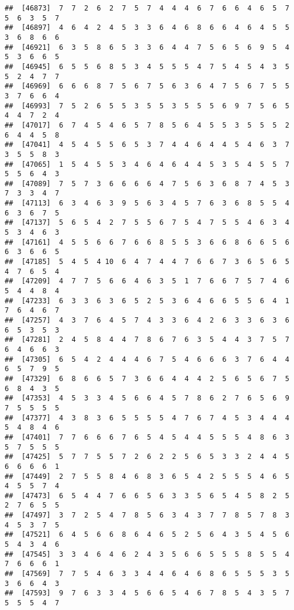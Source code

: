 \documentclass[
]{book}
\begin{document}
\begin{verbatim}
##  [46873]  7  7  2  6  2  7  5  7  4  4  4  6  7  6  6  4  6  5  7  5  6  3  5  7
##  [46897]  4  6  4  2  4  5  3  3  6  4  6  8  6  6  4  6  4  5  5  3  6  8  6  6
##  [46921]  6  3  5  8  6  5  3  3  6  4  4  7  5  6  5  6  9  5  4  5  3  6  6  5
##  [46945]  6  5  5  6  8  5  3  4  5  5  5  4  7  5  4  5  4  3  5  5  2  4  7  7
##  [46969]  6  6  6  8  7  5  6  7  5  6  3  6  4  7  5  6  7  5  5  3  7  6  6  4
##  [46993]  7  5  2  6  5  5  3  5  5  3  5  5  5  6  9  7  5  6  5  4  4  7  2  4
##  [47017]  6  7  4  5  4  6  5  7  8  5  6  4  5  5  3  5  5  5  2  6  4  4  5  8
##  [47041]  4  5  4  5  5  6  5  3  7  4  4  6  4  4  5  4  6  3  7  3  5  5  8  3
##  [47065]  1  5  4  5  5  3  4  6  4  6  4  4  5  3  5  4  5  5  7  5  5  6  4  3
##  [47089]  7  5  7  3  6  6  6  6  4  7  5  6  3  6  8  7  4  5  3  7  3  3  4  7
##  [47113]  6  3  4  6  3  9  5  6  3  4  5  7  6  3  6  8  5  5  4  6  3  6  7  5
##  [47137]  5  6  5  4  2  7  5  5  6  7  5  4  7  5  5  4  6  3  4  5  3  4  6  3
##  [47161]  4  5  5  6  6  7  6  6  8  5  5  3  6  6  8  6  6  5  6  6  3  6  6  5
##  [47185]  5  4  5  4 10  6  4  7  4  4  7  6  6  7  3  6  5  6  5  4  7  6  5  4
##  [47209]  4  7  7  5  6  6  4  6  3  5  1  7  6  6  7  5  7  4  6  5  4  4  8  4
##  [47233]  6  3  3  6  3  6  5  2  5  3  6  4  6  6  5  5  6  4  1  7  6  4  6  7
##  [47257]  4  3  7  6  4  5  7  4  3  3  6  4  2  6  3  3  6  3  6  6  5  3  5  3
##  [47281]  2  4  5  8  4  4  7  8  6  7  6  3  5  4  4  3  7  5  7  6  4  6  6  3
##  [47305]  6  5  4  2  4  4  4  6  7  5  4  6  6  6  3  7  6  4  4  6  5  7  9  5
##  [47329]  6  8  6  6  5  7  3  6  6  4  4  4  2  5  6  5  6  7  5  6  8  4  3  5
##  [47353]  4  5  3  3  4  5  6  6  4  5  7  8  6  2  7  6  5  6  9  7  5  5  5  5
##  [47377]  4  3  8  3  6  5  5  5  5  4  7  6  7  4  5  3  4  4  4  5  4  8  4  6
##  [47401]  7  7  6  6  6  7  6  5  4  5  4  4  5  5  5  4  8  6  3  5  7  5  5  5
##  [47425]  5  7  7  5  5  7  2  6  2  2  5  6  5  3  3  2  4  4  5  6  6  6  6  1
##  [47449]  2  7  5  5  8  4  6  8  3  6  5  4  2  5  5  5  4  6  5  4  5  5  7  4
##  [47473]  6  5  4  4  7  6  6  5  6  3  3  5  6  5  4  5  8  2  5  2  7  6  5  5
##  [47497]  3  7  2  5  4  7  8  5  6  3  4  3  7  7  8  5  7  8  3  4  5  3  7  5
##  [47521]  6  4  5  6  6  8  6  4  6  5  2  5  6  4  3  5  4  5  6  5  4  3  4  6
##  [47545]  3  3  4  6  4  6  2  4  3  5  6  6  5  5  5  8  5  5  4  7  6  6  6  1
##  [47569]  7  7  5  4  6  3  3  4  4  6  4  6  8  6  5  5  5  3  5  3  6  6  4  3
##  [47593]  9  7  6  3  3  4  5  6  6  5  4  6  7  8  5  4  3  5  7  5  5  5  4  7

\end{verbatim}
\end{document}
